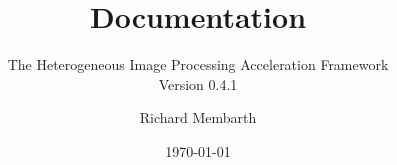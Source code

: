 


\title{\hipacc{} Documentation}
\subtitle{The Heterogeneous Image Processing Acceleration Framework\\Version 0.4.1}
\author{Richard Membarth}
\date{\today}

\maketitle

\cleardoublepage
\tableofcontents
\cleardoublepage






\nocite{membarth2011ggc}
\nocite{membarth2012gdg}
\nocite{membarth2012aoi}
\cleardoublepage
\appendix





